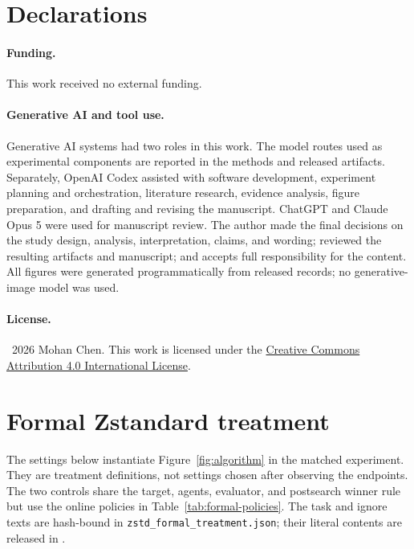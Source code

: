 \documentclass[10pt,twocolumn]{article}
\newcommand{\code}[1]{\texttt{#1}}
\begin{document}
\section*{Declarations}

\paragraph{Funding.}
This work received no external funding.

\paragraph{Generative AI and tool use.}
Generative AI systems had two roles in this work. The model routes used as
experimental components are reported in the methods and released artifacts.
Separately, OpenAI Codex assisted with software development, experiment
planning and orchestration, literature research, evidence analysis, figure
preparation, and drafting and revising the manuscript. ChatGPT and Claude Opus
5 were used for manuscript review. The author made the final decisions on the
study design, analysis, interpretation, claims, and wording; reviewed the
resulting artifacts and manuscript; and accepts full responsibility for the
content. All figures were generated programmatically from released records; no
generative-image model was used.

\paragraph{License.}
\textcopyright\ 2026 Mohan Chen. This work is licensed under the
\href{https://creativecommons.org/licenses/by/4.0/}{Creative Commons
Attribution 4.0 International License}.

\appendix

\section{Formal Zstandard treatment}
\label{app:formal-treatment}

The settings below instantiate Figure~\ref{fig:algorithm} in the matched
experiment. They are treatment definitions, not settings chosen after observing
the endpoints. The two controls share the target, agents, evaluator, and
postsearch winner rule but use the online policies in
Table~\ref{tab:formal-policies}. The task and ignore texts are hash-bound in
\code{zstd\_formal\_treatment.json}; their literal contents are released in
.
\end{document}
